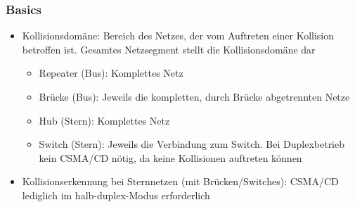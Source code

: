\subsubsection{Basics}
\begin{itemize}
	\item Kollisionsdomäne: Bereich des Netzes, der vom Auftreten einer Kollision betroffen ist. Gesamtes Netzsegment stellt die Kollisionsdomäne dar
	\begin{itemize}
		\item Repeater (Bus): Komplettes Netz
		\item Brücke (Bus): Jeweils die kompletten, durch Brücke abgetrennten Netze
		\item Hub (Stern): Komplettes Netz
		\item Switch (Stern): Jeweils die Verbindung zum Switch. Bei Duplexbetrieb kein CSMA/CD nötig, da keine Kollisionen auftreten können
	\end{itemize}
	\item Kollisionserkennung bei Sternnetzen (mit Brücken/Switches): CSMA/CD lediglich im halb-duplex-Modus erforderlich
\end{itemize}

